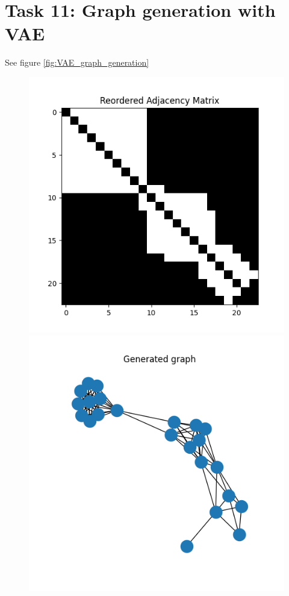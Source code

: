 \documentclass[a4paper]{article}
\begin{document}
% 
% 


\section*{Task 11: Graph generation with VAE}
See figure \ref{fig:VAE_graph_generation}

\begin{figure}[h]
    \centering
    \begin{minipage}{.45\textwidth}
      \includegraphics[width=0.7\linewidth]{figures/graph_00_adjacency_matrix.png}
    \end{minipage}\hfill
    \begin{minipage}{.45\textwidth}
      \includegraphics[width=0.7\linewidth]{figures/graph_00_generated_graph.png}
    \end{minipage}
  

\end{figure}
\end{document}
